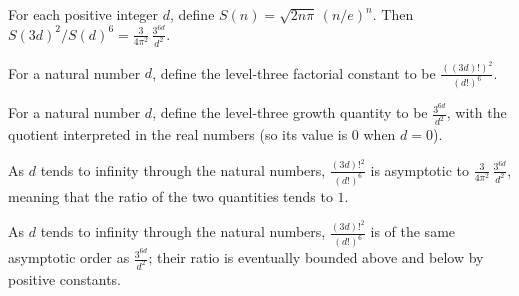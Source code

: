 \begin{theorem}
\label{FABL.factorialStirlingApprox_three_ratio_eq}
\leanok
{}
For each positive integer $d$, define $S(n)=\sqrt{2n\pi}\,(n/e)^n$. Then
$S(3d)^2/S(d)^6=\frac{3}{4\pi^2}\,\frac{3^{6d}}{d^2}$.
\end{theorem}

\begin{definition}
\label{FABL.levelThreeFactorialConstant}
\leanok
For a natural number $d$, define the level-three factorial constant to be
$\displaystyle\frac{((3d)!)^2}{(d!)^6}$.
\end{definition}

\begin{definition}
\label{FABL.levelThreeGrowth}
\leanok
For a natural number $d$, define the level-three growth quantity to be
$\displaystyle\frac{3^{6d}}{d^2}$, with the quotient interpreted in the real numbers (so
its value is $0$ when $d=0$).
\end{definition}

\begin{theorem}
\label{FABL.levelThreeFactorialConstant_isEquivalent}
\leanok
{}
As $d$ tends to infinity through the natural numbers, $\frac{(3d)!^2}{(d!)^6}$ is
asymptotic to $\frac{3}{4\pi^2}\,\frac{3^{6d}}{d^2}$, meaning that the ratio of the two
quantities tends to $1$.
\end{theorem}

\begin{theorem}
\label{FABL.levelThreeFactorialConstant_isTheta}
\leanok
{}
As $d$ tends to infinity through the natural numbers, $\frac{(3d)!^2}{(d!)^6}$ is of the
same asymptotic order as $\frac{3^{6d}}{d^2}$; their ratio is eventually bounded above
and below by positive constants.
\end{theorem}

